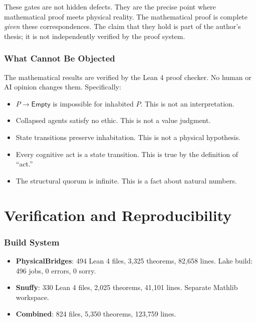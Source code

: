 \documentclass[11pt,a4paper]{article}
\theoremstyle{definition}
\theoremstyle{remark}
\newcommand{\NonBeing}{\mathsf{Empty}}
\begin{document}
These gates are not hidden defects. They are the precise point where mathematical proof meets physical reality. The mathematical proof is complete \emph{given} these correspondences. The claim that they hold is part of the author's thesis; it is not independently verified by the proof system.

\section{What Cannot Be Objected}

The mathematical results are verified by the Lean 4 proof checker. No human or AI opinion changes them. Specifically:

\begin{itemize}[nosep]
\item $P \to \NonBeing$ is impossible for inhabited $P$. This is not an interpretation.
\item Collapsed agents satisfy no ethic. This is not a value judgment.
\item State transitions preserve inhabitation. This is not a physical hypothesis.
\item Every cognitive act is a state transition. This is true by the definition of ``act.''
\item The structural quorum is infinite. This is a fact about natural numbers.
\end{itemize}

\part{Verification and Reproducibility}

\section{Build System}

\begin{itemize}[nosep]
\item \textbf{PhysicalBridges}: 494 Lean 4 files, 3,325 theorems, 82,658 lines. Lake build: 496 jobs, 0 errors, 0 sorry.
\item \textbf{Snuffy}: 330 Lean 4 files, 2,025 theorems, 41,101 lines. Separate Mathlib workspace.
\item \textbf{Combined}: 824 files, 5,350 theorems, 123,759 lines.
\end{itemize}
\end{document}
